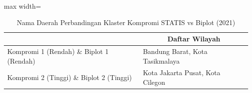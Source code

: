 \begin{table}[H]
\centering
\caption{Nama Daerah Perbandingan Klaster Kompromi STATIS vs Biplot (2021)} \label{tab:sample1biplot_comp_name_2021}
\begin{adjustbox}{max width=\textwidth}
\begin{tabular}{|>{\centering\arraybackslash}p{4cm}|p{10cm}|}
\hline
\multicolumn{1}{|c|}{\textbf{Kategori}} & \multicolumn{1}{c|}{\textbf{Daftar Wilayah}} \\
\hline
Kompromi 1 (Rendah) \& Biplot 1 (Rendah) & Bandung Barat, Kota Tasikmalaya \\
\hline
Kompromi 2 (Tinggi) \& Biplot 2 (Tinggi) & Kota Jakarta Pusat, Kota Cilegon \\
\hline
\end{tabular}
\end{adjustbox}
\end{table}